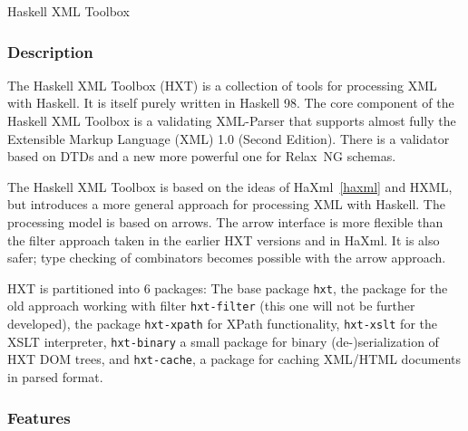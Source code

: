 \begin{hcarentry}[updated]{Haskell XML Toolbox}
\label{hxt}
\makeheader

\subsubsection*{Description}

The Haskell XML Toolbox (HXT) is a collection of tools for processing XML with
Haskell. It is itself purely written in Haskell 98. The core component of the
Haskell XML Toolbox is a validating XML-Parser that supports
almost fully the Extensible Markup Language (XML) 1.0 (Second Edition).
There is a validator based on DTDs and a new more powerful one for
Relax~NG schemas.

The Haskell XML Toolbox is based on the ideas of HaXml~\cref{haxml} and HXML,
but introduces a more general approach for processing XML with Haskell.
The processing model is based on arrows. The arrow interface is more flexible
than the filter approach taken in the earlier HXT versions and in HaXml.
It is also safer; type checking of combinators becomes possible with the arrow
approach.

HXT is partitioned into 6 packages: The base package {\tt hxt}, the package for the
old approach working with filter {\tt hxt-filter} (this one will not be further
developed), the package {\tt hxt-xpath} for XPath functionality, {\tt hxt-xslt}
for the XSLT interpreter, {\tt hxt-binary} a small package for binary (de-)serialization
of HXT DOM trees, and {\tt hxt-cache}, a package for caching XML/HTML documents in parsed
format.

\subsubsection*{Features}


\end{hcarentry}
